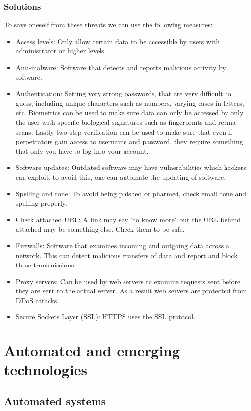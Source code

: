\documentclass{article}
\begin{document}
\subsubsection{Solutions}
To save oneself from these threats we can use the following measures:
\begin{itemize}
	\item Access levels: Only allow certain data to be accessible by users with 
		administrator or higher levels.
	\item Anti-malware: Software that detects and reports malicious activity by 
		software.
	\item Authentication: Setting very strong passwords, that are very difficult to 
		guess, including unique characters such as numbers, varying cases in letters,
		etc. Biometrics can be used to make sure data can only be accessed by only the
		user with specific biological signatures such as fingerprints and retina scans.
		Lastly two-step verification can be used to make sure that even if perpetrators
		gain access to username and password, they require something that only you have
		to log into your account.
	\item Software updates: Outdated software may have vulnerabilities which hackers
		can exploit, to avoid this, one can automate the updating of software.
	\item Spelling and tone: To avoid being phished or pharmed, check email tone and
		spelling properly.
	\item Check attached URL: A link may say "to know more" but the URL behind attached
		may be something else. Check them to be safe.
	\item Firewalls: Software that examines incoming and outgoing data across a network.
		This can detect malicious transfers of data and report and block those 
		transmissions.
	\item Proxy servers: Can be used by web servers to examine requests sent before
		they are sent to the actual server. As a result web servers are protected from
		DDoS attacks.
	\item Secure Sockets Layer (SSL): HTTPS uses the SSL protocol.
\end{itemize}

\section{Automated and emerging technologies}
\subsection{Automated systems}
\end{document}
